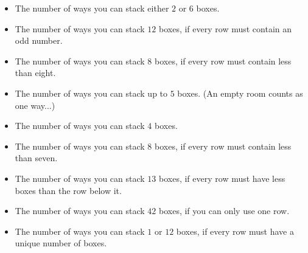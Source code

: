 \begin{multicols}{2}
  \begin{itemize}
    \item %
      The number of ways you can stack either \(2\) or \(6\) boxes.
    \item %
      The number of ways you can stack \(12\) boxes, if every row must
      contain an odd number.
    \item %
      The number of ways you can stack \(8\) boxes, if every row must contain
      less than eight.
    \item %
      The number of ways you can stack up to \(5\) boxes. (An empty room
      counts as one way...)
    \item %
      The number of ways you can stack \(4\) boxes.
  \end{itemize}
\columnbreak
  \begin{itemize}
    \item %
      The number of ways you can stack \(8\) boxes, if every row must contain
      less than seven.
    \item %
      The number of ways you can stack \(13\) boxes, if every row must have
      less boxes than the row below it.
    \item %
      The number of ways you can stack \(42\) boxes, if you can only use one
      row.
    \item %
      The number of ways you can stack \(1\) or \(12\) boxes, if every row must
      have a unique number of boxes.
  \end{itemize}
\end{multicols}





%
%
%
%
%





